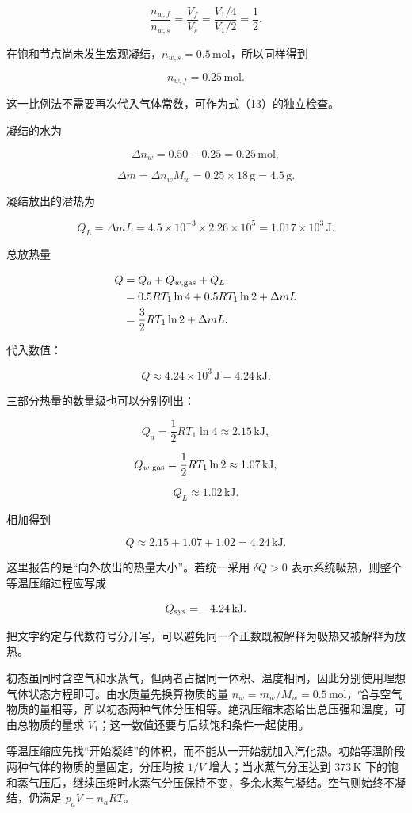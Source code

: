 \documentclass[12pt,a4paper,UTF8]{ctexart}
\begin{document}
\[\frac{n_{w,f}}{n_{w,s}}
=\frac{V_f}{V_s}
=\frac{V_1/4}{V_1/2}
=\frac12.\]

在饱和节点尚未发生宏观凝结，\(n_{w,s}=0.5\,\mathrm{mol}\)，所以同样得到

\[n_{w,f}=0.25\,\mathrm{mol}.\]

这一比例法不需要再次代入气体常数，可作为式（13）的独立检查。

凝结的水为

\[\Delta n_w=0.50-0.25=0.25\,\mathrm{mol},\]

\[\Delta m=\Delta n_wM_w
=0.25\times18\,\mathrm g=4.5\,\mathrm g. \tag{14}\]

凝结放出的潜热为

\[Q_L=\Delta mL
=4.5\times10^{-3}\times2.26\times10^5
=1.017\times10^3\,\mathrm J. \tag{15}\]

总放热量

\[\begin{aligned}
Q
&=Q_a+Q_{w,\rm gas}+Q_L\\
&=0.5RT_1\ln4+0.5RT_1\ln2+\Delta mL\\
&=\frac32RT_1\ln2+\Delta mL.
\end{aligned}\]

代入数值：

\[\boxed{Q\approx4.24\times10^3\,\mathrm J=4.24\,\mathrm{kJ}}. \tag{16}\]

三部分热量的数量级也可以分别列出：

\[Q_a=\frac12RT_1\ln4\approx2.15\,\mathrm{kJ},\]

\[Q_{w,\rm gas}=\frac12RT_1\ln2\approx1.07\,\mathrm{kJ},\]

\[Q_L\approx1.02\,\mathrm{kJ}.\]

相加得到

\[Q\approx2.15+1.07+1.02=4.24\,\mathrm{kJ}.\]

这里报告的是``向外放出的热量大小''。若统一采用 \(\delta Q>0\)
表示系统吸热，则整个等温压缩过程应写成

\[Q_{\rm sys}=-4.24\,\mathrm{kJ}.\]

把文字约定与代数符号分开写，可以避免同一个正数既被解释为吸热又被解释为放热。

初态虽同时含空气和水蒸气，但两者占据同一体积、温度相同，因此分别使用理想气体状态方程即可。由水质量先换算物质的量
\(n_w=m_w/M_w=0.5\,\mathrm{mol}\)，恰与空气物质的量相等，所以初态两种气体分压相等。绝热压缩末态给出总压强和温度，可由总物质的量求
\(V_1\)；这一数值还要与后续饱和条件一起使用。

等温压缩应先找``开始凝结''的体积，而不能从一开始就加入汽化热。初始等温阶段两种气体的物质的量固定，分压均按
\(1/V\) 增大；当水蒸气分压达到 \(373\,\mathrm K\)
下的饱和蒸气压后，继续压缩时水蒸气分压保持不变，多余水蒸气凝结。空气则始终不凝结，仍满足
\(p_aV=n_aRT\)。
\end{document}
